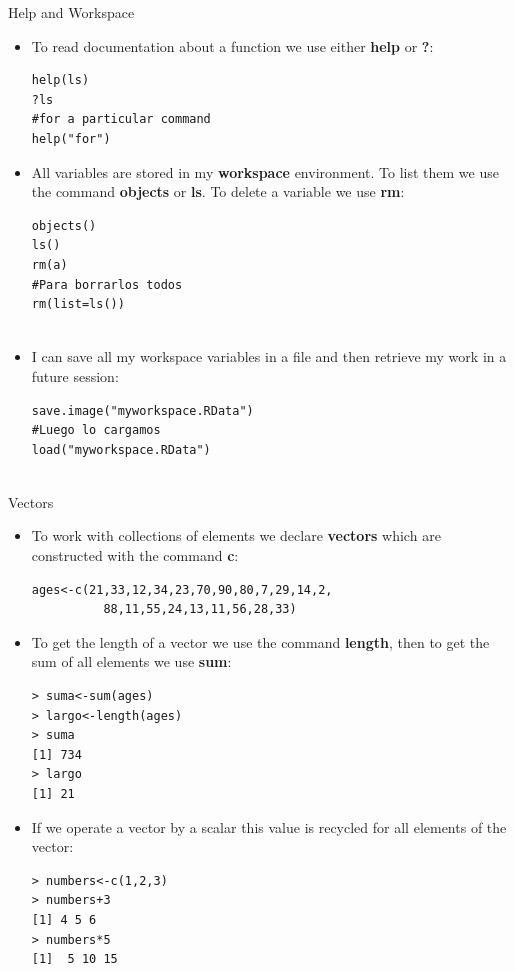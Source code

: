 \documentclass[handout]{beamer}
\begin{document}
\begin{frame}[fragile]{Help and Workspace}
\scriptsize{
\begin{itemize}
 \item To read documentation about a function we use either \textbf{help} or \textbf{?}:
\begin{verbatim}
help(ls)
?ls
#for a particular command
help("for")
\end{verbatim}

\item All variables are stored in my \textbf{workspace} environment. To list them we use the command \textbf{objects} or \textbf{ls}. To delete a variable we use \textbf{rm}:

\begin{verbatim}
objects()
ls()
rm(a)
#Para borrarlos todos
rm(list=ls())
 
\end{verbatim}


\item I can save all my workspace variables in a file and then retrieve my work in a future session:
\begin{verbatim}
save.image("myworkspace.RData")
#Luego lo cargamos
load("myworkspace.RData")
 
\end{verbatim}


 
 
 
 \end{itemize}



}
 
 
\end{frame}

\begin{frame}[fragile]{Vectors}
\scriptsize{
\begin{itemize}
 \item To work with collections of elements we declare \textbf{vectors} which are constructed with the command \textbf{c}:
 \begin{verbatim}
ages<-c(21,33,12,34,23,70,90,80,7,29,14,2,
          88,11,55,24,13,11,56,28,33)
 \end{verbatim}
 \item To get the length of a vector we use the command \textbf{length}, then to get the sum of all elements we use \textbf{sum}:
 \begin{verbatim}
> suma<-sum(ages)
> largo<-length(ages)
> suma
[1] 734
> largo
[1] 21
 \end{verbatim}
 
\item If we operate a vector by a scalar this value is recycled for all elements of the vector:
 \begin{verbatim}
> numbers<-c(1,2,3)
> numbers+3
[1] 4 5 6
> numbers*5
[1]  5 10 15
 \end{verbatim}
\end{itemize}




}
 
 
\end{frame}
\end{document}
